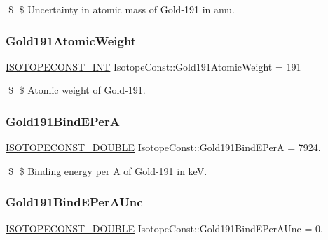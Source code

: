 \$ \$ Uncertainty in atomic mass of Gold-\/191 in amu. \mbox{\label{group___isotope_const-_gold-_au191_gae2fba30ed38eb3f151e867f61b33cc14}} 
\subsubsection{\texorpdfstring{Gold191\+Atomic\+Weight}{Gold191AtomicWeight}}
{\footnotesize\ttfamily \mbox{\hyperlink{group___isotope_const-_macros_ga5f18360b3e99483a35c32d789e62621c}{I\+S\+O\+T\+O\+P\+E\+C\+O\+N\+S\+T\+\_\+\+I\+NT}} Isotope\+Const\+::\+Gold191\+Atomic\+Weight = 191}

\$ \$ Atomic weight of Gold-\/191. \mbox{\label{group___isotope_const-_gold-_au191_ga0eb3e2c5e3819edf30ccb5e420b4a0bc}} 
\subsubsection{\texorpdfstring{Gold191\+Bind\+E\+PerA}{Gold191BindEPerA}}
{\footnotesize\ttfamily \mbox{\hyperlink{group___isotope_const-_macros_ga8f45a7272ce02c0b4c65c44636ed719a}{I\+S\+O\+T\+O\+P\+E\+C\+O\+N\+S\+T\+\_\+\+D\+O\+U\+B\+LE}} Isotope\+Const\+::\+Gold191\+Bind\+E\+PerA = 7924.}

\$ \$ Binding energy per A of Gold-\/191 in keV. \mbox{\label{group___isotope_const-_gold-_au191_ga07804d967ac7c492d81b29031b217a0f}} 
\subsubsection{\texorpdfstring{Gold191\+Bind\+E\+Per\+A\+Unc}{Gold191BindEPerAUnc}}
{\footnotesize\ttfamily \mbox{\hyperlink{group___isotope_const-_macros_ga8f45a7272ce02c0b4c65c44636ed719a}{I\+S\+O\+T\+O\+P\+E\+C\+O\+N\+S\+T\+\_\+\+D\+O\+U\+B\+LE}} Isotope\+Const\+::\+Gold191\+Bind\+E\+Per\+A\+Unc = 0.}

